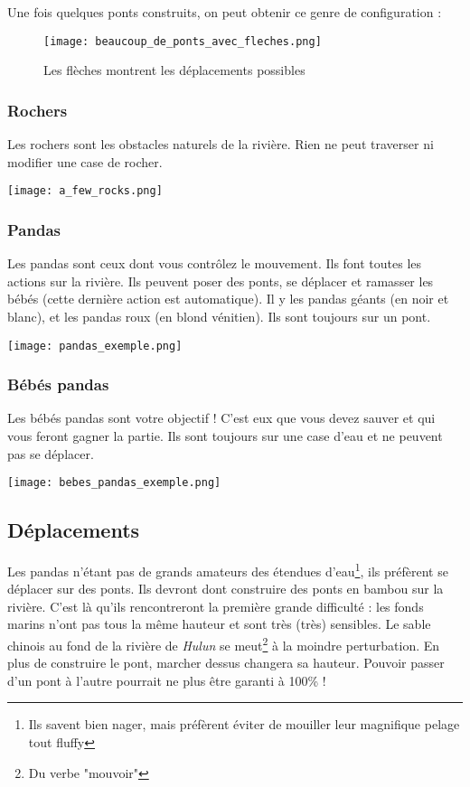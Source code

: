 \noindent Une fois quelques ponts construits, on peut obtenir ce genre de configuration :

\begin{center}
\begin{figure}[h]
    \centering
    \texttt{[image: beaucoup\_de\_ponts\_avec\_fleches.png]}
    \caption{Les flèches montrent les déplacements possibles}
\end{figure}
\end{center}

\subsubsection{Rochers}
Les rochers sont les obstacles naturels de la rivière. Rien ne peut traverser ni modifier une case de rocher.

\begin{center}
    \texttt{[image: a\_few\_rocks.png]}
\end{center}


\subsubsection{Pandas}
Les pandas sont ceux dont vous contrôlez le mouvement. Ils font toutes les actions sur la rivière. Ils peuvent poser des ponts, se déplacer et ramasser les bébés (cette dernière action est automatique). Il y les pandas géants (en noir et blanc), et les pandas roux (en blond vénitien). Ils sont toujours sur un pont.

\begin{center}
    \texttt{[image: pandas\_exemple.png]}
\end{center}

\newpage

\subsubsection{Bébés pandas}
Les bébés pandas sont votre objectif ! C'est eux que vous devez sauver et qui vous feront gagner la partie. Ils sont toujours sur une case d'eau et ne peuvent pas se déplacer.

\begin{center}
    \texttt{[image: bebes\_pandas\_exemple.png]}
\end{center}


\subsection{Déplacements}
Les pandas n'étant pas de grands amateurs des étendues d'eau\footnote{Ils savent bien nager, mais préfèrent éviter de mouiller leur magnifique pelage tout fluffy}, ils préfèrent se déplacer sur des ponts. Ils devront dont construire des ponts en bambou sur la rivière. C'est là qu'ils rencontreront la première grande difficulté : les fonds marins n'ont pas tous la même hauteur et sont très (très) sensibles. Le sable chinois au fond de la rivière de \textit{Hulun} se meut\footnote{Du verbe "mouvoir"} à la moindre perturbation. En plus de construire le pont, marcher dessus changera sa hauteur. Pouvoir passer d'un pont à l'autre pourrait ne plus être garanti à 100\% !


